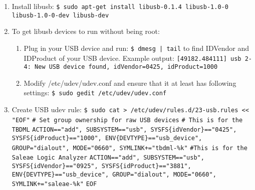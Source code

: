 \documentclass[12pt,notitlepage,onecolumn,oneside,openany]{memoir}
\begin{document}
\begin{enumerate}
\item \textsf{Install libusb:} \newline
      \texttt{\$ sudo apt-get install libusb-0.1.4 libusb-1.0-0 libusb-1.0-0-dev libusb-dev}

\item \textsf{To get libusb devices to run without being root:} \newline
	\begin{enumerate}
		\item \textsf{Plug in your USB device and run:} \newline
			\texttt{\$ dmesg | tail} \newline
			\textsf{to find IDVendor and IDProduct of your USB device.} \newline
			\textsf{Example output:} \newline
			\texttt{[49182.484111] usb 2-4: New USB device found, idVendor=0425, idProduct=1000} \newline

		\item \textsf{Modify /etc/udev/udev.conf and ensure that it at least has following settings:} \newline
			\texttt{\$ sudo gedit /etc/udev/udev.conf} \newline		
			 \newline
			 \newline
			 \newline
			 \newline
			 \newline
	\end{enumerate}
\item \textsf{Create USB udev rule:} \newline
      \texttt{\$ sudo cat > /etc/udev/rules.d/23-usb.rules << "EOF"} \newline
      \texttt{\# Set group ownership for raw USB devices} \newline
      \texttt{\# This is for the TBDML} \newline
      \texttt{ACTION=="add", SUBSYSTEM=="usb", SYSFS\{idVendor\}=="0425", SYSFS\{idProduct\}=="1000", ENV\{DEVTYPE\}=="usb\_device", GROUP="dialout", MODE="0660", SYMLINK+="tbdml-\%k"} \newline
      \texttt{\#This is for the Saleae Logic Analyzer} \newline
      \texttt{ACTION=="add", SUBSYSTEM=="usb", SYSFS\{idVendor\}=="0925", SYSFS\{idProduct\}=="3881", ENV\{DEVTYPE\}=="usb\_device", GROUP="dialout", MODE="0660", SYMLINK+="saleae-\%k"} \newline
      \texttt{EOF}


\end{enumerate}
\end{document}
